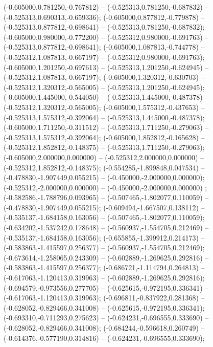 (-0.605000,0.781250,-0.767812) -- (-0.525313,0.781250,-0.687832) -- (-0.525313,0.690313,-0.659336);
 (-0.605000,0.877812,-0.779878) -- (-0.525313,0.877812,-0.698641) -- (-0.525313,0.781250,-0.687832);
 (-0.605000,0.980000,-0.772200) -- (-0.525312,0.980000,-0.691763) -- (-0.525313,0.877812,-0.698641);
 (-0.605000,1.087813,-0.744778) -- (-0.525312,1.087813,-0.667197) -- (-0.525312,0.980000,-0.691763);
 (-0.605000,1.201250,-0.697613) -- (-0.525313,1.201250,-0.624945) -- (-0.525312,1.087813,-0.667197);
 (-0.605000,1.320312,-0.630703) -- (-0.525312,1.320312,-0.565005) -- (-0.525313,1.201250,-0.624945);
 (-0.605000,1.445000,-0.544050) -- (-0.525313,1.445000,-0.487378) -- (-0.525312,1.320312,-0.565005);
 (-0.605000,1.575312,-0.437653) -- (-0.525313,1.575312,-0.392064) -- (-0.525313,1.445000,-0.487378);
 (-0.605000,1.711250,-0.311512) -- (-0.525313,1.711250,-0.279063) -- (-0.525313,1.575312,-0.392064);
 (-0.605000,1.852812,-0.165628) -- (-0.525312,1.852812,-0.148375) -- (-0.525313,1.711250,-0.279063);
 (-0.605000,2.000000,0.000000) -- (-0.525312,2.000000,0.000000) -- (-0.525312,1.852812,-0.148375);
 (-0.554285,-1.899848,0.047534) -- (-0.478830,-1.907449,0.055215) -- (-0.450000,-2.000000,0.000000);
 (-0.525312,-2.000000,0.000000) -- (-0.450000,-2.000000,0.000000) ;
 (-0.582586,-1.788796,0.093965) -- (-0.507465,-1.802077,0.110059) -- (-0.478830,-1.907449,0.055215);
 (-0.609494,-1.667507,0.138112) -- (-0.535137,-1.684158,0.163056) -- (-0.507465,-1.802077,0.110059);
 (-0.634202,-1.537242,0.178648) -- (-0.560937,-1.554705,0.212469) -- (-0.535137,-1.684158,0.163056);
 (-0.655855,-1.399912,0.214173) -- (-0.583863,-1.415597,0.256377) -- (-0.560937,-1.554705,0.212469);
 (-0.673614,-1.258065,0.243309) -- (-0.602889,-1.269625,0.292816) -- (-0.583863,-1.415597,0.256377);
 (-0.686721,-1.114794,0.264813) -- (-0.617063,-1.120413,0.319963) -- (-0.602889,-1.269625,0.292816);
 (-0.694579,-0.973556,0.277705) -- (-0.625615,-0.972195,0.336341) -- (-0.617063,-1.120413,0.319963);
 (-0.696811,-0.837922,0.281368) -- (-0.628052,-0.829466,0.341008) -- (-0.625615,-0.972195,0.336341);
 (-0.693310,-0.711293,0.275623) -- (-0.624231,-0.696555,0.333690) -- (-0.628052,-0.829466,0.341008);
 (-0.684244,-0.596618,0.260749) -- (-0.614376,-0.577190,0.314816) -- (-0.624231,-0.696555,0.333690);
